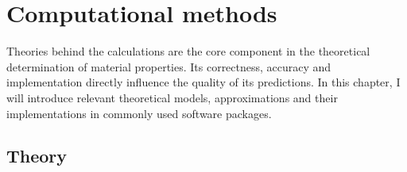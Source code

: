 
\chapter{Computational methods \label{chap:2}}
%
\ifpdf
    \graphicspath{{Chapter2/Figs/Raster/}{Chapter2/Figs/PDF/}{Chapter2/Figs/}{Chapter2/Figs/Vector/}}
\else
    \graphicspath{{Chapter2/Figs/Vector/}{Chapter2/Figs/}}
\fi
%
Theories behind the calculations are the core component in the theoretical determination of material properties. Its correctness, accuracy and implementation directly influence the quality of its predictions. In this chapter, I will introduce relevant theoretical models, approximations and their implementations in commonly used software packages.
%
\section{Theory}
